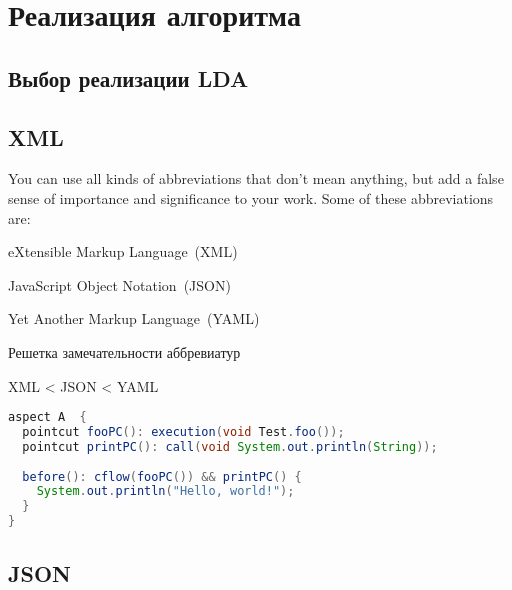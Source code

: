 \chapter{Реализация алгоритма}
\label{chap:impl}

\section{Выбор реализации LDA}

\section{XML}

\blindtext

You can use all kinds of abbreviations that don't mean anything, but add
a false sense of importance and significance to your work. Some of these
abbreviations are:
%
\begin{itemize*}
\item eXtensible Markup Language~(XML)
\item JavaScript Object Notation~(JSON)
\item Yet Another Markup Language~(YAML)
\end{itemize*}
%

\begin{table}
\caption{Решетка замечательности аббревиатур}
\centering
XML < JSON < YAML
\end{table}

\Blindtext

  \begin{lstlisting}[language=Java, label={lst:aspectj_example}, 
  caption={Пример описания аспектов в AspectJ}]
aspect A  {
  pointcut fooPC(): execution(void Test.foo());
  pointcut printPC(): call(void System.out.println(String));
  
  before(): cflow(fooPC()) && printPC() {
    System.out.println("Hello, world!");
  }
}
  \end{lstlisting}

\section{JSON}

\Blindtext
